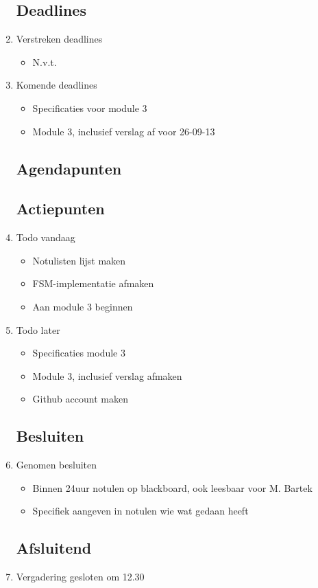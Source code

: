 \documentclass{article}
\begin{document}
\begin{enumerate}
	\subsection*{Deadlines}
	\item Verstreken deadlines
	\begin{itemize}
		\item N.v.t.
	\end{itemize}
	\item Komende deadlines
	\begin{itemize}
		\item Specificaties voor module 3
		\item Module 3, inclusief verslag af voor 26-09-13
	\end{itemize}

	\subsection*{Agendapunten}
	

	\subsection*{Actiepunten}
	\item Todo vandaag
	\begin{itemize}
		\item Notulisten lijst maken
		\item FSM-implementatie afmaken
		\item Aan module 3 beginnen
	\end{itemize}
	\item Todo later
	\begin{itemize}
		\item Specificaties module 3
		\item Module 3, inclusief verslag afmaken
		\item Github account maken
	\end{itemize}

	\subsection*{Besluiten}
	\item Genomen besluiten
	\begin{itemize}
		\item Binnen 24uur notulen op blackboard, ook leesbaar voor M. Bartek
		\item Specifiek aangeven in notulen wie wat gedaan heeft
	\end{itemize}

	\noindent 
	\subsection*{Afsluitend}
	\item Vergadering gesloten om 12.30 %

\end{enumerate}
\end{document}
